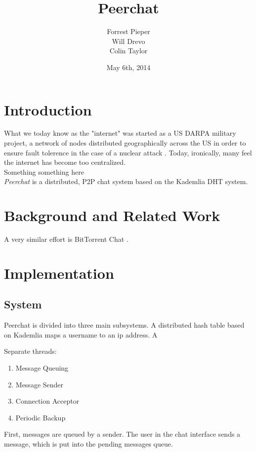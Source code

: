 \documentclass{article}
\title{Peerchat}
\author{
  Forrest Pieper\\
  Will Drevo\\
  Colin Taylor
}
\date{May 6th, 2014}
\begin{document}
\maketitle

\section{Introduction}
\label{introduction}

What we today know as the "internet" was started as a US DARPA military project, a network of nodes distributed geographically across the US in order to ensure fault tolerence in the case of a nuclear attack \cite{?}. Today, ironically, many feel the internet has become too centralized. \\

Something something here \\

\textit{Peerchat} is a distributed, P2P chat system based on the Kademlia DHT \cite{Maymounkov02} system. 

\section{Background and Related Work}

A very similar effort is BitTorrent Chat \cite{?}. 

\section{Implementation}

\subsection{System}
Peerchat is divided into three main subsystems. A distributed hash table based on Kademlia \cite{?} maps a username to an ip address. A 

Separate threads:
\begin{enumerate}
	\item Message Queuing
	\item Message Sender
	\item Connection Acceptor
	\item Periodic Backup 
\end{enumerate}

First, messages are queued by a sender. The user in the chat interface sends a message, which is put into the pending messages queue. 
\end{document}
